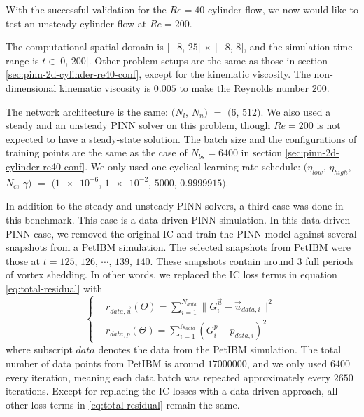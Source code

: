 With the successful validation for the $Re=40$ cylinder flow, we now would like to test an unsteady cylinder flow at $Re=200$.

The computational spatial domain is $[-8$, $25]$ $\times$ $[-8$, $8]$, and the simulation time range is $t\in[0$, $200]$.
Other problem setups are the same as those in section \ref{sec:pinn-2d-cylinder-re40-conf}, except for the kinematic viscosity.
The non-dimensional kinematic viscosity is $0.005$ to make the Reynolds number $200$.

The network architecture is the same: $(N_l$, $N_n)$ $=$ $(6$, $512)$.
We also used a steady and an unsteady PINN solver on this problem, though $Re=200$ is not expected to have a steady-state solution.
The batch size and the configurations of training points are the same as the case of $N_{bs}=\num{6400}$ in section \ref{sec:pinn-2d-cylinder-re40-conf}.
We only used one cyclical learning rate schedule: $(\eta_{low}$, $\eta_{high}$, $N_c$, $\gamma)$ $=$ $(\num{1e-6}$, $\num{1e-2}$, $5000$, $0.9999915)$.

In addition to the steady and unsteady PINN solvers, a third case was done in this benchmark.
This case is a data-driven PINN simulation.
In this data-driven PINN case, we removed the original IC and train the PINN model against several snapshots from a PetIBM simulation.
The selected snapshots from PetIBM were those at $t=125$, $126$, $\cdots$, $139$, $140$.
These snapshots contain around $3$ full periods of vortex shedding.
In other words, we replaced the IC loss terms in equation \eqref{eq:total-residual} with  
\begin{equation}\label{eq:data-driven-loss}
    \left\{
        \begin{aligned}
            &r_{data,\vec{u}}(\Theta) = \sum\limits_{i=1}^{N_{data}}\lVert G_i^{\vec{u}} - \vec{u}_{data, i}\rVert^2 \\
            &r_{data,p}(\Theta) = \sum\limits_{i=1}^{N_{data}}\left( G_i^{p} - p_{data, i} \right)^2
        \end{aligned}
    \right.
\end{equation}
where subscript $data$ denotes the data from the PetIBM simulation.
The total number of data points from PetIBM is around $\num{17000000}$, and we only used $\num{6400}$ every iteration, meaning each data batch was repeated approximately every $\num{2650}$ iterations.
Except for replacing the IC losses with a data-driven approach, all other loss terms in \eqref{eq:total-residual} remain the same.

